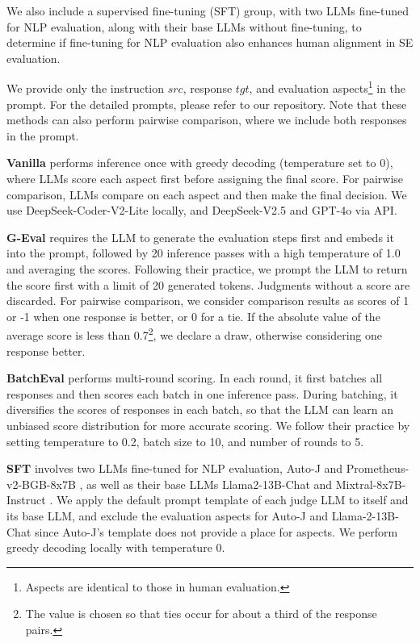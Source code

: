We also include a supervised fine-tuning (SFT) group, with two LLMs fine-tuned for NLP evaluation, along with their base LLMs without fine-tuning, to determine if fine-tuning for NLP evaluation also enhances human alignment in SE evaluation. 

We provide only the instruction \(src\), response \(tgt\), and evaluation aspects\footnote{Aspects are identical to those in human evaluation.} in the prompt. For the detailed prompts, please refer to our repository. Note that these methods can also perform pairwise comparison, where we include both responses in the prompt. 

\textbf{Vanilla} performs inference once with greedy decoding (temperature set to 0), where LLMs score each aspect first before assigning the final score. For pairwise comparison, LLMs compare on each aspect and then make the final decision. We use DeepSeek-Coder-V2-Lite locally, and DeepSeek-V2.5 and GPT-4o via API.

\textbf{G-Eval} \cite{DBLP:conf/emnlp/LiuIXWXZ23} requires the LLM to generate the evaluation steps first and embeds it into the prompt, followed by 20 inference passes with a high temperature of 1.0 and averaging the scores. Following their practice, we prompt the LLM to return the score first with a limit of 20 generated tokens. Judgments without a score are discarded. For pairwise comparison, we consider comparison results as scores of 1 or -1 when one response is better, or 0 for a tie. If the absolute value of the average score is less than 0.7\footnote{The value is chosen so that ties occur for about a third of the response pairs.}, we declare a draw, otherwise considering one response better.

\textbf{BatchEval} \cite{DBLP:conf/acl/YuanFLWPWH024a} performs multi-round scoring. In each round, it first batches all responses and then scores each batch in one inference pass. During batching, it diversifies the scores of responses in each batch, so that the LLM can learn an unbiased score distribution for more accurate scoring. We follow their practice by setting temperature to 0.2, batch size to 10, and number of rounds to 5.

\textbf{SFT} involves two LLMs fine-tuned for NLP evaluation, Auto-J \cite{DBLP:conf/iclr/LiSYF0024} and Prometheus-v2-BGB-8x7B \cite{DBLP:journals/corr/abs-2405-01535}, as well as their base LLMs Llama2-13B-Chat \cite{DBLP:journals/corr/abs-2307-09288} and Mixtral-8x7B-Instruct \cite{DBLP:journals/corr/abs-2401-04088}. We apply the default prompt template of each judge LLM to itself and its base LLM, and exclude the evaluation aspects for Auto-J and Llama-2-13B-Chat since Auto-J's template does not provide a place for aspects. We perform greedy decoding locally with temperature 0.

